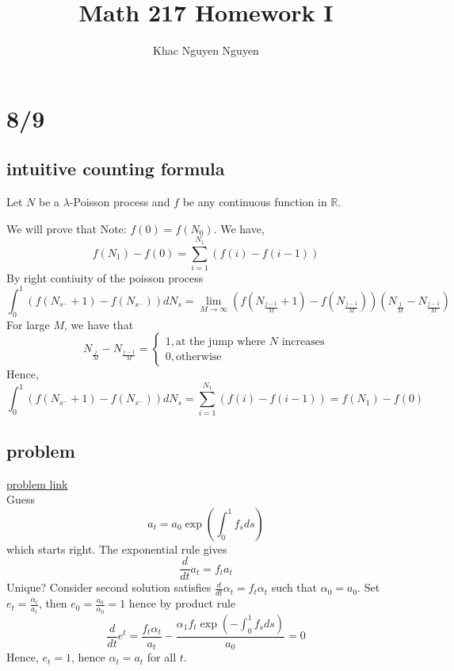 \documentclass[11pt]{article}
\title{\textbf{Math 217 Homework I}}
\author{Khac Nguyen Nguyen}
\date{}
\begin{document}
\tableofcontents
\pagebreak
\section{8/9}
\subsection{intuitive counting formula}
Let $N$ be a $\lambda$-Poisson process and $f$ be any continuous function in $\mathbb{R}$. 

We will prove that 
Note: $f(0) = f(N_0)$.
We have, 
\[
    f(N_1) - f(0) = \sum_{i=1}^{N_1} \left(f(i)-f(i-1) \right)
\]
By right contiuity of the poisson process 
\[
    \int_0^1 \left(f(N_{s^-} + 1) - f(N_{s^-})\right) dN_s = \lim_{M \to \infty} \left(f\left(N_{\frac{j-1}{M}}+1\right) - f\left(N_{\frac{j-1}{M}}\right) \right) \left(N_{\frac{j}{M}} - N_{\frac{j-1}{M}}\right)
\]
For large $M$, we have that 
\[
    N_{\frac{j}{M}} - N_{\frac{j-1}{M}} = 
    \begin{cases}
        1, \text{at the jump where $N$ increases} \\
        0, \text{otherwise}
    \end{cases}  
\] 
Hence, 
\[
    \int_0^1 \left(f(N_{s^-} + 1) - f(N_{s^-})\right) dN_s = \sum_{i=1}^{N_1} \left(f(i)-f(i-1) \right) = f(N_1) - f(0)
\]
\newpage
\subsection{problem}
\href{https://sbsprobability.com/b/43432?context=%5B"25842"%2C"m8"%2C"m8_1"%2C"43241"%5D}{problem link} \\
Guess
\[
    a_t = a_0 \exp \left({\int_0^1 f_s ds}\right)
\]
which starts right. The exponential rule gives 
\[
    \frac{d}{dt} a_t = f_t a_t    
\]
Unique? Consider second solution satisfies $\frac{d}{dt} \alpha_t = f_t \alpha_t$ such that $\alpha_0 = a_0$. 
Set $e_t = \frac{\alpha_t}{a_t}$, then $e_0 = \frac{a_0}{\alpha_0} = 1$ hence by product rule
\[
    \frac{d}{dt} e^t = \frac{f_t \alpha_t}{a_t} - \frac{\alpha_1 f_t \exp \left({-\int_0^1 f_s ds}\right)}{a_0} = 0
\]
Hence, $e_t = 1$, hence $\alpha_t = a_t$ for all $t$.
\end{document}
